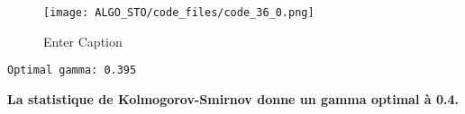 \documentclass[11pt]{article}
\begin{document}
\begin{figure}
    \texttt{[image: ALGO\_STO/code\_files/code\_36\_0.png]}
    \caption{Enter Caption}
    \label{fig:enter-label}
\end{figure}

    \begin{Verbatim}[commandchars=\\\{\}]
Optimal gamma: 0.395
    \end{Verbatim}

    \textbf{La statistique de Kolmogorov-Smirnov donne un gamma optimal à
0.4.}


    
    
    
\end{document}

